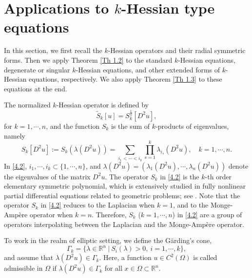 \documentclass[a4paper,11pt]{amsart}
\theoremstyle{plain}
\theoremstyle{remark}
\numberwithin{equation}{section}
\numberwithin{figure}{section}
\numberwithin{remark}{section}
\begin{document}
\begin{sloppypar}
\vspace{3mm}



\section{Applications to $k$-Hessian type equations}\label{Section 4}

\sloppy{}

In this section, we first recall the $k$-Hessian operators and their radial symmetric forms. Then we apply Theorem \ref{Th 1.2} to the standard $k$-Hessian equations, degenerate or singular $k$-Hessian equations, and other extended forms of $k$-Hessian equations, respectively. We also apply Theorem \ref{Th 1.3} to these equations at the end.

The normalized $k$-Hessian operator is defined by
\begin{equation}\label{4.1}
\tilde S_k [u] = S_k^{\frac{1}{k}} [D^2u],
\end{equation}
for $k=1, \cdots, n$, and the function $S_k$ is the sum of $k$-products of eigenvalues, namely
	\begin{equation}\label{4.2}
	S_k[D^2u]:= S_k(\lambda (D^2u)) = \sum_{i_1<\cdots<i_k} \prod_{s=1}^k \lambda_{i_s}(D^2u), \quad k=1, \cdots, n.
	\end{equation}
In \eqref{4.2}, $i_1, \cdots, i_k \subset \{1, \cdots, n\}$, and $\lambda(D^2u) = (\lambda_1(D^2u), \cdots, \lambda_n(D^2u))$ denote the eigenvalues of the matrix $D^2u$. The operator $S_k$ in \eqref{4.2} is the $k$-th order elementary symmetric polynomial, which is extensively studied in fully nonlinear partial differential equations related to geometric problems; see \cite{T1995, W2009}. Note that the operator $S_k$ in \eqref{4.2} reduces to the Laplacian when $k=1$, and to the Monge-Amp\`ere operator when $k=n$. Therefore, $S_k$ ($k=1, \cdots, n$) in \eqref{4.2} are a group of operators interpolating between the Laplacian and the Monge-Amp\`ere operator.

To work in the realm of elliptic setting, we define the G\"arding's cone,
	\begin{equation}\label{4.3}
	\Gamma_k = \{ \lambda \in \mathbb{R}^n \ | \ S_i(\lambda)>0, \ i=1,\cdots, k\},
	\end{equation}
and  assume that $\lambda(D^2u)\in \Gamma_{k}$.
Here, a function $u\in C^2(\Omega)$ is called admissible in $\Omega$ if $\lambda(D^2u)\in \Gamma_{k}$ for all $x\in \Omega\subset \mathbb{R}^n$.


\end{sloppypar}
\end{document}
